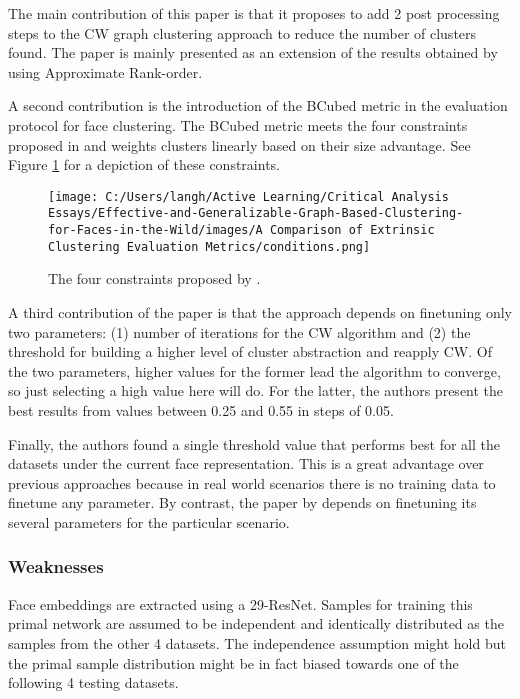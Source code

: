 \documentclass[]{article}
\begin{document}
The main contribution of this paper is that it proposes to add 2 post processing steps to the CW graph clustering approach to reduce the number of clusters found. The paper is mainly presented as an extension of the results obtained by \autocite{otto2018} using Approximate Rank-order.

A second contribution is the introduction of the BCubed metric in the evaluation protocol for face clustering. The BCubed metric meets the four constraints proposed in \autocite{amigo2009} and weights clusters linearly based on their size advantage. See Figure \ref{fig:conditions} for a depiction of these constraints.

\begin{figure}
\centering
\texttt{[image: C:/Users/langh/Active Learning/Critical Analysis Essays/Effective-and-Generalizable-Graph-Based-Clustering-for-Faces-in-the-Wild/images/A Comparison of Extrinsic Clustering Evaluation Metrics/conditions.png]}
\caption{The four constraints proposed by \autocite{amigo2009}.\label{fig:conditions}}
\end{figure}

A third contribution of the paper is that the approach depends on finetuning only two parameters: (1) number of iterations for the CW algorithm and (2) the threshold for building a higher level of cluster abstraction and reapply CW. Of the two parameters, higher values for the former lead the algorithm to converge, so just selecting a high value here will do. For the latter, the authors present the best results from values between 0.25 and 0.55 in steps of 0.05.

Finally, the authors found a single threshold value that performs best for all the datasets under the current face representation. This is a great advantage over previous approaches because in real world scenarios there is no training data to finetune any parameter. By contrast, the paper by \autocite{otto2018} depends on finetuning its several parameters for the particular scenario.

\hypertarget{weaknesses}{%
\subsubsection{Weaknesses}\label{weaknesses}}

Face embeddings are extracted using a 29-ResNet. Samples for training this primal network are assumed to be independent and identically distributed as the samples from the other 4 datasets. The independence assumption might hold but the primal sample distribution might be in fact biased towards one of the following 4 testing datasets.
\end{document}
